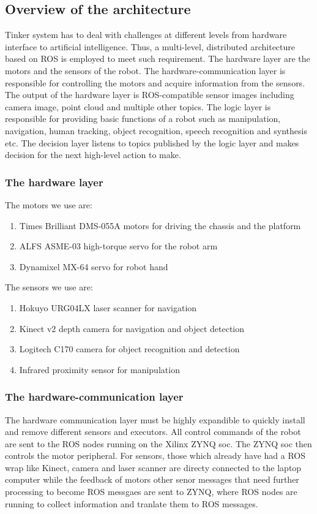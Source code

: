 \subsection{Overview of the architecture}
Tinker system has to deal with challenges at different levels from hardware interface to artificial intelligence. Thus, a multi-level, distributed architecture based on ROS is employed to meet such requirement. The hardware layer are the motors and the sensors of the robot. The hardware-communication layer is responsible for controlling the motors and acquire information from the sensors. The output of the hardware layer is ROS-compatible sensor images including camera image, point cloud and multiple other topics. The logic layer is responsible for providing basic functions of a robot such as manipulation, navigation, human tracking, object recognition, speech recognition and synthesis etc. The decision layer listens to topics published by the logic layer and makes decision for the next high-level action to make.
\subsubsection{The hardware layer}
The motors we use are:
\begin{enumerate}
    \item Times Brilliant DMS-055A motors for driving the chassis and the platform
    \item ALFS ASME-03 high-torque servo for the robot arm
    \item Dynamixel MX-64 servo for robot hand
\end{enumerate}
The sensors we use are:
\begin{enumerate}
    \item Hokuyo URG04LX laser scanner for navigation
    \item Kinect v2 depth camera for navigation and object detection
    \item Logitech C170 camera for object recognition and detection
    \item Infrared proximity sensor for manipulation
\end{enumerate}
\subsubsection{The hardware-communication layer}
The hardware communication layer must be highly expandible to quickly install and remove different sensors and executors. All control commands of the robot are sent to the ROS nodes running on the Xilinx ZYNQ soc. The ZYNQ soc then controls the motor peripheral. 
For sensors, those which already have had a ROS wrap like Kinect, camera and laser scanner are directy connected to the laptop computer while the feedback of motors other senor messages that need further processing to become ROS messgaes are sent to ZYNQ, where ROS nodes are running to collect information and tranlate them to ROS messages.

